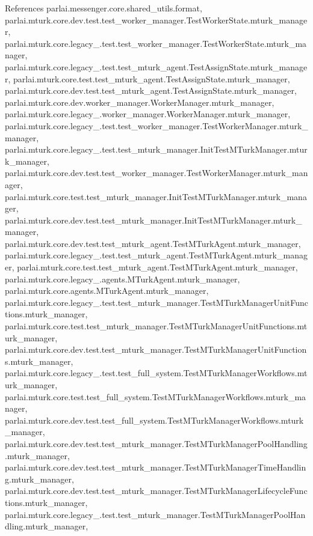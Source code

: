 References parlai.\+messenger.\+core.\+shared\+\_\+utils.\+format, parlai.\+mturk.\+core.\+dev.\+test.\+test\+\_\+worker\+\_\+manager.\+Test\+Worker\+State.\+mturk\+\_\+manager, parlai.\+mturk.\+core.\+legacy\+\_.\+test.\+test\+\_\+worker\+\_\+manager.\+Test\+Worker\+State.\+mturk\+\_\+manager, parlai.\+mturk.\+core.\+legacy\+\_.\+test.\+test\+\_\+mturk\+\_\+agent.\+Test\+Assign\+State.\+mturk\+\_\+manager, parlai.\+mturk.\+core.\+test.\+test\+\_\+mturk\+\_\+agent.\+Test\+Assign\+State.\+mturk\+\_\+manager, parlai.\+mturk.\+core.\+dev.\+test.\+test\+\_\+mturk\+\_\+agent.\+Test\+Assign\+State.\+mturk\+\_\+manager, parlai.\+mturk.\+core.\+dev.\+worker\+\_\+manager.\+Worker\+Manager.\+mturk\+\_\+manager, parlai.\+mturk.\+core.\+legacy\+\_.\+worker\+\_\+manager.\+Worker\+Manager.\+mturk\+\_\+manager, parlai.\+mturk.\+core.\+legacy\+\_.\+test.\+test\+\_\+worker\+\_\+manager.\+Test\+Worker\+Manager.\+mturk\+\_\+manager, parlai.\+mturk.\+core.\+legacy\+\_.\+test.\+test\+\_\+mturk\+\_\+manager.\+Init\+Test\+M\+Turk\+Manager.\+mturk\+\_\+manager, parlai.\+mturk.\+core.\+dev.\+test.\+test\+\_\+worker\+\_\+manager.\+Test\+Worker\+Manager.\+mturk\+\_\+manager, parlai.\+mturk.\+core.\+test.\+test\+\_\+mturk\+\_\+manager.\+Init\+Test\+M\+Turk\+Manager.\+mturk\+\_\+manager, parlai.\+mturk.\+core.\+dev.\+test.\+test\+\_\+mturk\+\_\+manager.\+Init\+Test\+M\+Turk\+Manager.\+mturk\+\_\+manager, parlai.\+mturk.\+core.\+dev.\+test.\+test\+\_\+mturk\+\_\+agent.\+Test\+M\+Turk\+Agent.\+mturk\+\_\+manager, parlai.\+mturk.\+core.\+legacy\+\_.\+test.\+test\+\_\+mturk\+\_\+agent.\+Test\+M\+Turk\+Agent.\+mturk\+\_\+manager, parlai.\+mturk.\+core.\+test.\+test\+\_\+mturk\+\_\+agent.\+Test\+M\+Turk\+Agent.\+mturk\+\_\+manager, parlai.\+mturk.\+core.\+legacy\+\_.\+agents.\+M\+Turk\+Agent.\+mturk\+\_\+manager, parlai.\+mturk.\+core.\+agents.\+M\+Turk\+Agent.\+mturk\+\_\+manager, parlai.\+mturk.\+core.\+legacy\+\_.\+test.\+test\+\_\+mturk\+\_\+manager.\+Test\+M\+Turk\+Manager\+Unit\+Functions.\+mturk\+\_\+manager, parlai.\+mturk.\+core.\+test.\+test\+\_\+mturk\+\_\+manager.\+Test\+M\+Turk\+Manager\+Unit\+Functions.\+mturk\+\_\+manager, parlai.\+mturk.\+core.\+dev.\+test.\+test\+\_\+mturk\+\_\+manager.\+Test\+M\+Turk\+Manager\+Unit\+Functions.\+mturk\+\_\+manager, parlai.\+mturk.\+core.\+legacy\+\_.\+test.\+test\+\_\+full\+\_\+system.\+Test\+M\+Turk\+Manager\+Workflows.\+mturk\+\_\+manager, parlai.\+mturk.\+core.\+test.\+test\+\_\+full\+\_\+system.\+Test\+M\+Turk\+Manager\+Workflows.\+mturk\+\_\+manager, parlai.\+mturk.\+core.\+dev.\+test.\+test\+\_\+full\+\_\+system.\+Test\+M\+Turk\+Manager\+Workflows.\+mturk\+\_\+manager, parlai.\+mturk.\+core.\+dev.\+test.\+test\+\_\+mturk\+\_\+manager.\+Test\+M\+Turk\+Manager\+Pool\+Handling.\+mturk\+\_\+manager, parlai.\+mturk.\+core.\+dev.\+test.\+test\+\_\+mturk\+\_\+manager.\+Test\+M\+Turk\+Manager\+Time\+Handling.\+mturk\+\_\+manager, parlai.\+mturk.\+core.\+dev.\+test.\+test\+\_\+mturk\+\_\+manager.\+Test\+M\+Turk\+Manager\+Lifecycle\+Functions.\+mturk\+\_\+manager, parlai.\+mturk.\+core.\+legacy\+\_.\+test.\+test\+\_\+mturk\+\_\+manager.\+Test\+M\+Turk\+Manager\+Pool\+Handling.\+mturk\+\_\+manager, 
